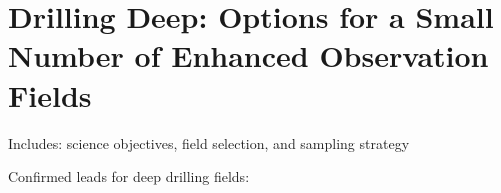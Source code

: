 \chapter[Deep Drilling Fields]{Drilling Deep: Options for a Small Number of Enhanced Observation
Fields}

Includes: science objectives, field selection, and sampling strategy

Confirmed leads for deep drilling fields:
